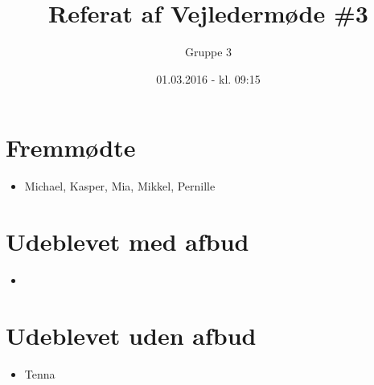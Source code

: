 \documentclass{article}
\title{Referat af Vejledermøde \#3}
\author{Gruppe 3}
\date{01.03.2016 - kl. 09:15}
\begin{document}
	\maketitle
	
	\section{Fremmødte}
	\begin{itemize}
		\item Michael, Kasper, Mia, Mikkel, Pernille
	\end{itemize}
	
	\section{Udeblevet med afbud}
	\begin{itemize}
		\item 
	\end{itemize}
	
	\section{Udeblevet uden afbud}
	\begin{itemize}
		\item Tenna
	\end{itemize}
	
\end{document}
